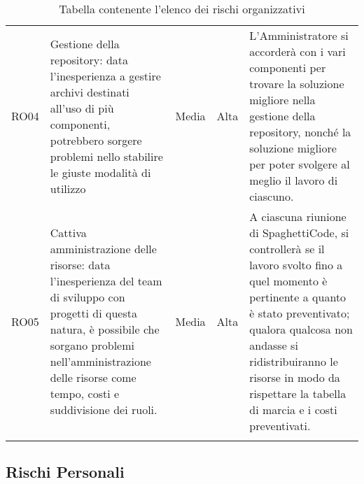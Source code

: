 \documentclass[../piano_di_progetto.tex]{subfiles}
\begin{document}
\begin{center}
\begin{longtable}{|c|p{4.5cm}|c|c|p{4.5cm}|}
		RO04 		& 
		Gestione della repository: data l'inesperienza a gestire archivi destinati all'uso di più componenti, potrebbero sorgere problemi nello stabilire le giuste modalità di utilizzo & 
		Media 		& 
		Alta 		& 
		L’Amministratore si accorderà con i vari componenti per trovare la soluzione migliore nella gestione della repository, nonché la soluzione migliore per poter svolgere al meglio il lavoro di ciascuno. \\

		RO05 		& 
		Cattiva amministrazione delle risorse: data l’inesperienza del team di sviluppo con progetti di questa natura, è possibile che sorgano problemi nell’amministrazione delle risorse come tempo, costi e suddivisione dei ruoli.  & 
		Media 		& 
		Alta 		& 
		A ciascuna riunione di SpaghettiCode, si controllerà se il lavoro svolto fino a quel momento è pertinente a quanto è stato preventivato; qualora qualcosa non andasse si ridistribuiranno le risorse in modo da rispettare la tabella di marcia e i costi preventivati.\\

		\hline
		\rowcolor{white}
		\caption{Tabella contenente l'elenco dei rischi organizzativi}
	\end{longtable}

\end{center}


\subsection{Rischi Personali}%
\label{sub:rischi_pers}
\end{document}
